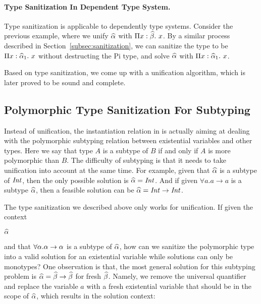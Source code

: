 \paragraph{Type Sanitization In Dependent Type System.}
Type sanitization is applicable to dependently type systems. Consider the previous
example, where we unify $\widehat{\alpha}$ with $\Pi x:\widehat{\beta}.~ x$. By a similar process
described in Section~\ref{subsec:sanitization}, we can sanitize the type to be
$\Pi x:\widehat{\alpha}_1.~ x$ without destructing the Pi type, and solve $\widehat{\alpha}$ with
$\Pi x:\widehat{\alpha}_1.~ x$.




Based on type sanitization, we come up with a unification algorithm, which is
later proved to be sound and complete.

\subsection{Polymorphic Type Sanitization For Subtyping}

Instead of unification, the instantiation relation in
\citet{dunfield2013complete} is actually aiming at dealing with the polymorphic
subtyping relation between existential variables and other types. Here we say
that type $A$ is a subtype of $B$ if and only if $A$ is more polymorphic than $B$.
The difficulty of subtyping is that it needs to take unification
into account at the same time. For example, given that $\widehat{\alpha}$ is a subtype of
$\mathit{Int}$, then the only possible solution is $\widehat{\alpha} = \mathit{Int}$. And if given $\forall
a. a \to a$ is a subtype $\widehat{\alpha}$, then a feasible solution can be $\widehat{\alpha} = \mathit{Int}
\to \mathit{Int}$.

The type sanitization we described above only works for unification. If given
the context

$\widehat{\alpha}$

\noindent and that $\forall \alpha. \alpha \to \alpha$ is a subtype of $\widehat{\alpha}$, how
can we sanitize the polymorphic type into a valid solution for an existential
variable while solutions can only be monotypes? One observation is that, the most
general solution for this subtyping problem is $\widehat{\alpha} = \widehat{\beta} \to \widehat{\beta}$ for
fresh $\widehat{\beta}$. Namely, we remove the universal quantifier and replace the
variable $a$ with a fresh existential variable that should be in the scope of
$\widehat{\alpha}$, which results in the solution context:


